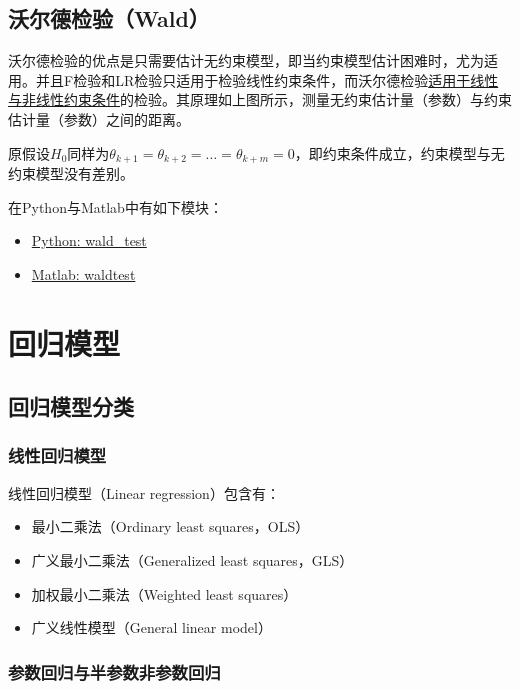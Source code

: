 \documentclass[11pt]{article}
\begin{document}
\subsection{沃尔德检验（Wald）}

沃尔德检验的优点是只需要估计无约束模型，即当约束模型估计困难时，尤为适用。并且F检验和LR检验只适用于检验线性约束条件，而沃尔德检验\uline{适用于线性与非线性约束条件}的检验。其原理如上图所示，测量无约束估计量（参数）与约束估计量（参数）之间的距离。

原假设$H_0$同样为$\theta_{k+1}=\theta_{k+2}=\dots=\theta_{k+m}=0$，即约束条件成立，约束模型与无约束模型没有差别。

\begin{remark}
    在Python与Matlab中有如下模块：
    \begin{itemize}
        \item \href{https://www.statsmodels.org/stable/generated/statsmodels.regression.linear_model.RegressionResults.wald_test.html}{Python: wald\_test}
        \item \href{https://www.mathworks.com/help/econ/waldtest.html}{Matlab: waldtest}
    \end{itemize}
\end{remark}

\section{回归模型}

\subsection{回归模型分类}

\subsubsection*{线性回归模型}

线性回归模型（Linear regression）包含有：
\begin{itemize}
    \item 最小二乘法（Ordinary least squares，OLS）
    \item 广义最小二乘法（Generalized least squares，GLS）
    \item 加权最小二乘法（Weighted least squares）
    \item 广义线性模型（General linear model）
\end{itemize}

\subsubsection*{参数回归与半参数非参数回归}
\end{document}
